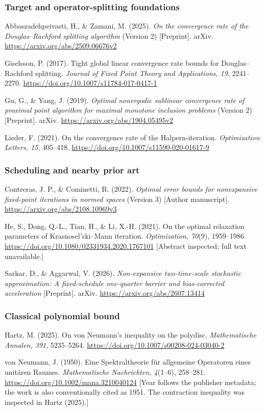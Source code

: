 \documentclass[
  british,
  11pt,
  a4paper,
]{article}
\newcounter{none} %
\begin{document}
\begingroup\small

\subsubsection{Target and operator-splitting
foundations}\label{target-and-operator-splitting-foundations}

Abbaszadehpeivasti, H., \& Zamani, M. (2025). \emph{On the convergence
rate of the Douglas--Rachford splitting algorithm} (Version 2)
{[}Preprint{]}. arXiv. \url{https://arxiv.org/abs/2509.06676v2}

Giselsson, P. (2017). Tight global linear convergence rate bounds for
Douglas--Rachford splitting. \emph{Journal of Fixed Point Theory and
Applications, 19}, 2241--2270.
\url{https://doi.org/10.1007/s11784-017-0417-1}

Gu, G., \& Yang, J. (2019). \emph{Optimal nonergodic sublinear
convergence rate of proximal point algorithm for maximal monotone
inclusion problems} (Version 2) {[}Preprint{]}. arXiv.
\url{https://arxiv.org/abs/1904.05495v2}

Lieder, F. (2021). On the convergence rate of the Halpern-iteration.
\emph{Optimization Letters, 15}, 405--418.
\url{https://doi.org/10.1007/s11590-020-01617-9}

\subsubsection{Scheduling and nearby prior
art}\label{scheduling-and-nearby-prior-art}

Contreras, J. P., \& Cominetti, R. (2022). \emph{Optimal error bounds
for nonexpansive fixed-point iterations in normed spaces} (Version 3)
{[}Author manuscript{]}. \url{https://arxiv.org/abs/2108.10969v3}

He, S., Dong, Q.-L., Tian, H., \& Li, X.-H. (2021). On the optimal
relaxation parameters of Krasnosel'ski--Mann iteration.
\emph{Optimization, 70}(9), 1959--1986.
\url{https://doi.org/10.1080/02331934.2020.1767101} {[}Abstract
inspected; full text unavailable.{]}

Sarkar, D., \& Aggarwal, V. (2026). \emph{Non-expansive two-time-scale
stochastic approximation: A fixed-schedule one-quarter barrier and
bias-corrected acceleration} {[}Preprint{]}. arXiv.
\url{https://arxiv.org/abs/2607.13414}

\subsubsection{Classical polynomial
bound}\label{classical-polynomial-bound}

Hartz, M. (2025). On von Neumann's inequality on the polydisc.
\emph{Mathematische Annalen, 391}, 5235--5264.
\url{https://doi.org/10.1007/s00208-024-03040-2}

von Neumann, J. (1950). Eine Spektraltheorie für allgemeine Operatoren
eines unitären Raumes. \emph{Mathematische Nachrichten, 4}(1--6),
258--281. \url{https://doi.org/10.1002/mana.3210040124} {[}Year follows
the publisher metadata; the work is also conventionally cited as 1951.
The contraction inequality was inspected in Hartz (2025).{]}

\endgroup
\end{document}
